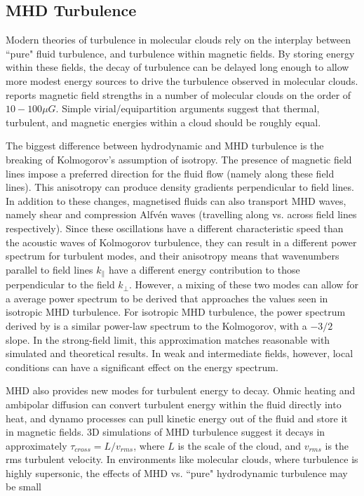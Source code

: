 \documentclass[12pt, preprint]{aastex}
\begin{document}
\subsection{MHD Turbulence}
Modern theories of turbulence in molecular clouds rely on the interplay between
``pure" fluid turbulence, and turbulence within magnetic fields.  By storing
energy within these fields, the decay of turbulence can be delayed long enough
to allow more modest energy sources to drive the turbulence observed in
molecular clouds.  \citet{shu1987} reports magnetic field strengths in a number
of molecular clouds on the order of $10-100 \mu G$.  Simple virial/equipartition
arguments suggest that thermal, turbulent, and magnetic energies within a cloud
should be roughly equal.

The biggest difference between hydrodynamic and MHD turbulence is the breaking
of Kolmogorov's assumption of isotropy.  The presence of magnetic field lines
impose a preferred direction for the fluid flow (namely along these field
lines).  This anisotropy can produce density gradients perpendicular to field
lines.  In addition to these changes, magnetised fluids can also transport MHD
waves, namely shear and compression Alfv\'{e}n waves (travelling along vs.
across field lines respectively).  Since these oscillations have a different
characteristic speed than the acoustic waves of Kolmogorov turbulence, they can
result in a different power spectrum for turbulent modes, and their anisotropy
means that wavenumbers parallel to field lines $k_\parallel$ have a different
energy contribution to those perpendicular to the field $k_\perp$.  However, a
mixing of these two modes can allow for a average power spectrum to be derived
that approaches the values seen in isotropic MHD turbulence.  For
isotropic MHD turbulence, the power spectrum derived by \citet{irosh1964} is a
similar power-law spectrum to the Kolmogorov, with a $-3/2$ slope.  In the
strong-field limit, this approximation matches reasonable with simulated and
theoretical results.  In weak and intermediate fields, however, local conditions
can have a significant effect on the energy spectrum.  

MHD also provides new modes for turbulent energy to decay.  Ohmic heating and
ambipolar diffusion can convert turbulent energy within the fluid directly into
heat, and dynamo processes can pull kinetic energy out of the fluid and store it
in magnetic fields.  3D simulations of MHD turbulence suggest it decays in
approximately $\tau_{cross} = L/v_{rms}$, where $L$ is the scale of the cloud,
and $v_{rms}$ is the rms turbulent velocity. In environments like molecular
clouds, where turbulence is highly supersonic, the effects of MHD vs. ``pure"
hydrodynamic turbulence may be small \citep{elm2004}
\end{document}
